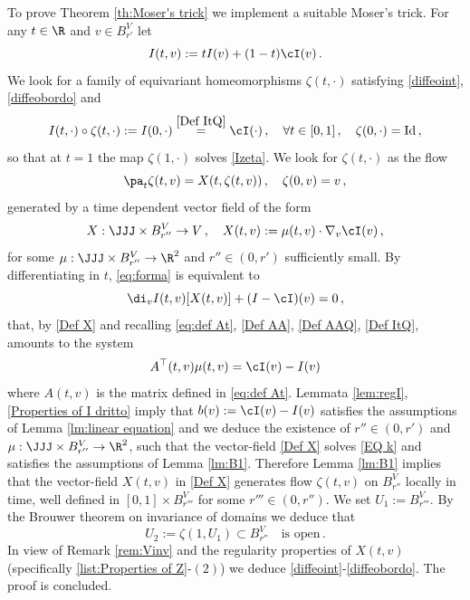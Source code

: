 \documentclass[11pt,a4paper,reqno]{article}
\numberwithin{equation}{section}
\theoremstyle{definition}
\begin{document}
To prove Theorem \ref{th:Moser's trick}
we implement a suitable Moser's trick.
For any $t\in \R $ and $v\in B_{r'}^V$ let 
\begin{equation}\label{Def ItQ}
    I(t,v):= t I(v)+(1-t)\cI(v)\, .
\end{equation}
We look for  a family of equivariant homeomorphisms $ \zeta (t,\cdot)  $ satisfying 
\eqref{diffeoint}, \eqref{diffeobordo} and 
\begin{equation}\label{eq:forma}
    I(t, \cdot)  \circ \zeta (t, \cdot)  := I(0, \cdot) 
    \stackrel{\eqref{Def ItQ}} = \cI (\cdot )   \, , \quad \forall t \in [0,1] \, , \quad \zeta (0, \cdot)  = \text{Id} \, , 
\end{equation}
so that at $ t = 1 $ the map 
$ \zeta(1, \cdot)   $
solves \eqref{Izeta}. 
We look for $ \zeta(t, \cdot)  $ as the flow 
$$
\pa_t \zeta (t, v) = X(t,\zeta (t, v)) \, , \quad 
\zeta (0, v) = v  \, , 
$$
generated by a time dependent vector field of the form 
\begin{equation}\label{Def X}
X:\JJJ\times B_{r''}^V\to V \, , \quad
    X(t,v):=\mu(t,v)\cdot \nabla_v  \cI(v)  \, , 
\end{equation}
for some $ \mu:\JJJ\times B_{r''}^V \to  \R^2 $
and   $r''\in (0,r')$ sufficiently small. 
By differentiating in $ t $,   \eqref{eq:forma} is equivalent to
\begin{equation}\label{Moser's trick}
        \di_v I(t,v)[X(t,v)] 
        + (I- \cI)(v) = 0  
        \, , 
\end{equation} 
that, by  \eqref{Def X} and recalling \eqref{eq:def At},
\eqref{Def AA}, \eqref{Def AAQ}, \eqref{Def ItQ},  amounts to the system 
\begin{equation}\label{EQ k}
        A^\top(t,v) \mu(t,v)=\cI(v)-I(v) 
\end{equation}
where $ A(t,v) $ is the matrix defined 
in \eqref{eq:def At}. 
 Lemmata \ref{lem:regI},  \ref{Properties of I dritto} imply that 
$ b(v) := \cI(v)-I(v) $ satisfies the assumptions of Lemma \ref{lm:linear equation}
and 
  we deduce the  existence of $ r''\in (0,r')$ and 
    $ \mu:\JJJ\times B_{r''}^V \to  \R^2 $, 
        such that the vector-field \eqref{Def X} solves %
        \eqref{EQ k} and satisfies the assumptions of Lemma \ref{lm:B1}.
    Therefore Lemma \ref{lm:B1} implies  that the vector-field $ X(t,v) $ in \eqref{Def X} generates 
     flow $\zeta (t, v) $ on $B_{r''}^V$ locally in time, well defined  in $[0,1] \times B_{r'''}^V $ 
    for some  $r'''\in(0,r'')$.
    We set $U_1:=B_{r'''}^V$.
    By  the Brouwer theorem on invariance of domains we deduce that 
    \begin{equation}\label{def:U2}
        U_2:=\zeta(1, U_1)\subset B_{r''}^V\quad \text{is open} \, . 
    \end{equation}
    In view of Remark \ref{rem:Vinv} and the regularity properties of $X(t,v)$ (specifically \eqref{list:Properties of Z}-$(2)$) we deduce \eqref{diffeoint}-\eqref{diffeobordo}. The  proof 
    is concluded. 
\end{document}
